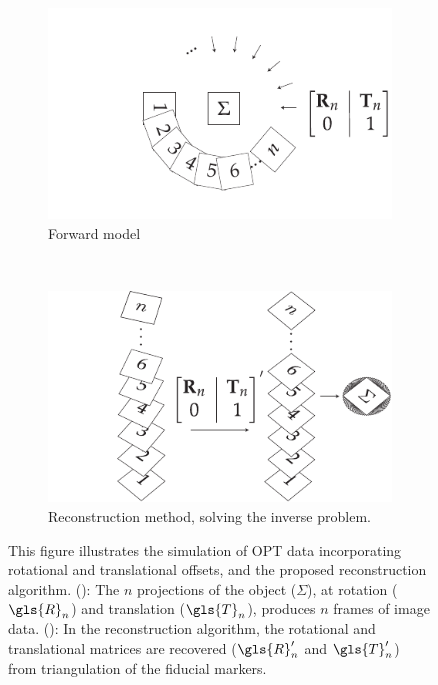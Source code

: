 \begin{figure}
    \centering
    \begin{subfigure}[t]{\textwidth}
      \centering
      \includegraphics{flopt_algorithm_forward}
      \caption{Forward model}
      \label{fig:flopt_algorithm_forward}
    \end{subfigure}~
    \begin{subfigure}[t]{\textwidth}
      \centering
      \includegraphics{flopt_algorithm}
      \caption{Reconstruction method, solving the inverse problem.}
      \label{fig:flopt_algorithm_inverse}
    \end{subfigure}
    \caption{
    This figure illustrates the simulation of OPT data incorporating rotational and translational offsets, and the proposed reconstruction algorithm.
    (): The \(n\) projections of the object (\(\Sigma \)), at rotation (\(\gls{R}_n\)) and translation (\(\gls{T}_n\)), produces \(n\) frames of image data.
    (): In the reconstruction algorithm, the rotational and translational matrices are recovered (\(\gls{R}_n'\) and \(\gls{T}_n'\)) from triangulation of the fiducial markers.
}
\end{figure}
